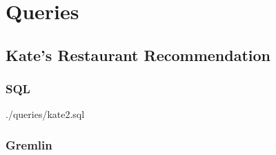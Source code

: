 \section{Queries}
\label{app:queries}

\subsection{Kate's Restaurant Recommendation}

\subsubsection{SQL}






{./queries/kate2.sql}


\subsubsection{Gremlin}


